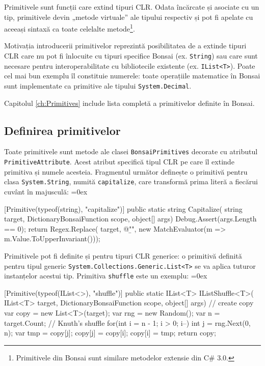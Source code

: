 \documentclass[12pt,a4paper]{memoir}
\renewcommand{\c}{\texttt}
\newenvironment{code}
{
\definecolor{shadecolor}{gray}{0.91}
\topsep=0ex
\relax
\shaded
\verbatim
}
{
\endverbatim
\endshaded
}
\begin{document}
Primitivele sunt funcții care extind tipuri CLR. Odata încărcate și asociate cu un tip, primitivele devin „metode virtuale” ale tipului respectiv și pot fi apelate cu aceeași sintaxă ca toate celelalte metode\footnote{Primitivele din Bonsai sunt similare metodelor extensie din C\# 3.0.}.

Motivația introducerii primitivelor reprezintă posibilitatea de a extinde tipuri CLR care nu pot fi înlocuite cu tipuri specifice Bonsai (ex. \c{String}) sau care sunt necesare pentru interoperabilitate cu bibliotecile existente (ex. \c{IList<T>}). Poate cel mai bun exemplu îl constituie numerele: toate operațiile matematice în Bonsai sunt implementate ca primitive ale tipului \c{System.Decimal}.

Capitolul \ref{ch:Primitives} include lista completă a primitivelor definite în Bonsai.

\subsection{Definirea primitivelor}

Toate primitivele sunt metode ale clasei \c{BonsaiPrimitives} decorate cu atributul \c{PrimitiveAttribute}. Acest atribut specifică tipul CLR pe care îl extinde primitiva și numele acesteia. Fragmentul următor definește o primitivă pentru clasa \c{System.String}, numită \c{capitalize}, care transformă prima literă a fiecărui cuvânt în majusculă:
\begin{code}
[Primitive(typeof(string), "capitalize")]
public static string Capitalize(
  string target,
  DictionaryBonsaiFunction scope,
  object[] args)
{
  Debug.Assert(args.Length == 0);
  return Regex.Replace(
    target, @"\b\w",
    new MatchEvaluator(m => m.Value.ToUpperInvariant()));
}
\end{code}

Primitivele pot fi definite și pentru tipuri CLR generice: o primitivă definită pentru tipul generic \c{System.Collections.Generic.List<T>} se va aplica tuturor instanțelor acestui tip. Primitiva \c{shuffle} este un exemplu:
\begin{code}
[Primitive(typeof(IList<>), "shuffle")]
public static IList<T> IListShuffle<T>(
  IList<T> target,
  DictionaryBonsaiFunction scope,
  object[] args)
{
  // create copy
  var copy = new List<T>(target);
  var rng = new Random();
  var n = target.Count;
  // Knuth's shuffle
  for(int i = n - 1; i > 0; i--) {
    int j = rng.Next(0, n);
    var tmp = copy[j];
    copy[j] = copy[i];
    copy[i] = tmp;
  }
  return copy;
}
\end{code}
\end{document}
